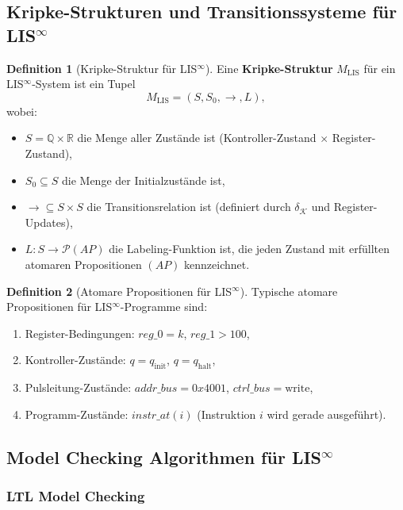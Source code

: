 \documentclass[a4paper,12pt]{article}
\theoremstyle{definition}
\newtheorem{definition}{Definition}
\begin{document}
	\subsection{Kripke-Strukturen und Transitionssysteme für LIS$^{\infty}$}
	
	\begin{definition}[Kripke-Struktur für LIS$^{\infty}$]
		\label{def:kripke_lis}
		Eine \textbf{Kripke-Struktur} $M_{\text{LIS}}$ für ein LIS$^{\infty}$-System ist ein Tupel
		\[
		M_{\text{LIS}} = (S, S_0, \to, L),
		\]
		wobei:
		\begin{itemize}
			\item $S = \mathbb{Q} \times \mathbb{R}$ die Menge aller Zustände ist (Kontroller-Zustand $\times$ Register-Zustand),
			\item $S_0 \subseteq S$ die Menge der Initialzustände ist,
			\item $\to \subseteq S \times S$ die Transitionsrelation ist (definiert durch $\delta_{\mathcal{K}}$ und Register-Updates),
			\item $L : S \to \mathcal{P}(AP)$ die Labeling-Funktion ist, die jeden Zustand mit erfüllten atomaren Propositionen $(AP)$ kennzeichnet.
		\end{itemize}
	\end{definition}
	
	\begin{definition}[Atomare Propositionen für LIS$^{\infty}$]
		\label{def:atomare_prop_lis}
		Typische atomare Propositionen für LIS$^{\infty}$-Programme sind:
		\begin{enumerate}
			\item Register-Bedingungen: $reg\_0 = k$, $reg\_1 > 100$,
			\item Kontroller-Zustände: $q = q_{\text{init}}$, $q = q_{\text{halt}}$,
			\item Pulsleitung-Zustände: $addr\_bus = 0x4001$, $ctrl\_bus = \text{write}$,
			\item Programm-Zustände: $instr\_at(i)$ (Instruktion $i$ wird gerade ausgeführt).
		\end{enumerate}
	\end{definition}
	
	\subsection{Model Checking Algorithmen für LIS$^{\infty}$}
	
	\subsubsection{LTL Model Checking}
	
\end{document}

